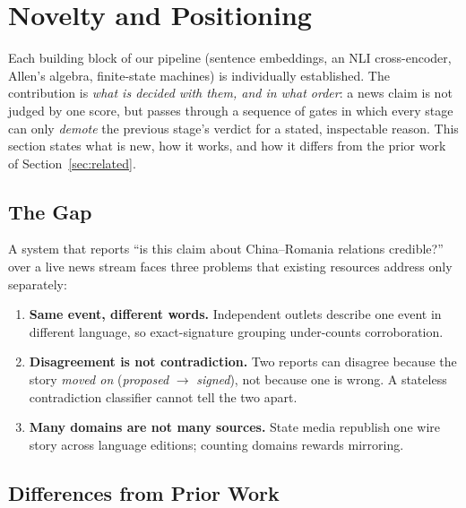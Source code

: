 %

\section{Novelty and Positioning}
\label{sec:novelty}

Each building block of our pipeline (sentence embeddings, an NLI
cross-encoder, Allen's algebra, finite-state machines) is individually
established. The contribution is \emph{what is decided with them, and in
what order}: a news claim is not judged by one score, but passes through a
sequence of gates in which every stage can only \emph{demote} the previous
stage's verdict for a stated, inspectable reason. This section states what is
new, how it works, and how it differs from the prior work of
Section~\ref{sec:related}.

\subsection{The Gap}

A system that reports ``is this claim about China--Romania relations
credible?'' over a live news stream faces three problems that existing
resources address only separately:

\begin{enumerate}
  \item \textbf{Same event, different words.} Independent outlets describe
        one event in different language, so exact-signature grouping
        under-counts corroboration.
  \item \textbf{Disagreement is not contradiction.} Two reports can
        disagree because the story \emph{moved on}
        (\emph{proposed} $\to$ \emph{signed}), not because one is wrong. A
        stateless contradiction classifier cannot tell the two apart.
  \item \textbf{Many domains are not many sources.} State media republish
        one wire story across language editions; counting domains rewards
        mirroring.
\end{enumerate}

\subsection{Differences from Prior Work}

